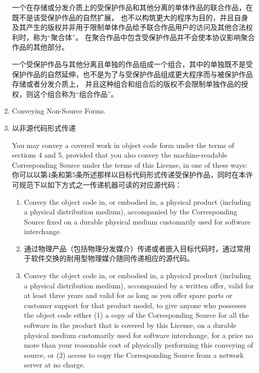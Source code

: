 \documentclass[11pt]{article}
\begin{document}
\begin{enumerate}
        一个在存储或分发介质上的受保护作品和其他分离的单体作品的联合作品，在既不是该受保护作品的自然扩展，
        也不以构筑更大的程序为目的，并且自身及其产生的版权并非用于限制单体作品给予联合作品用户的访问及其他合法权利时，称为“聚合体”。
        在聚合作品中包含受保护作品并不会使本协议影响聚合作品的其他部分。

        一个受保护作品与其他分离且单独的作品组成一个组合，其中的单独既不是受保护作品的自然延伸，也不是为了与受保护作品组成更大程序而与被保护作品存储或者分发介质上，
        并且这种组合和组合后的版权不会限制单独作品的授权，则这个组合称为“组合作品”。

  \item Conveying Non-Source Forms.
  \item 以非源代码形式传递

        You may convey a covered work in object code form under the terms
        of sections 4 and 5, provided that you also convey the
        machine-readable Corresponding Source under the terms of this License,
        in one of these ways:
        你可以以第4条和第5条所述那样以目标代码形式传递受保护作品，同时在本许可规范下以如下方式之一传递机器可读的对应源代码：

        \begin{enumerate}
          \item Convey the object code in, or embodied in, a physical product
                (including a physical distribution medium), accompanied by the
                Corresponding Source fixed on a durable physical medium
                customarily used for software interchange.
          \item 通过物理产品（包括物理分发媒介）传递或者嵌入目标代码时，通过常用于软件交换的耐用型物理媒介随同传递相应的源代码。

          \item Convey the object code in, or embodied in, a physical product
                (including a physical distribution medium), accompanied by a
                written offer, valid for at least three years and valid for as
                long as you offer spare parts or customer support for that product
                model, to give anyone who possesses the object code either (1) a
                copy of the Corresponding Source for all the software in the
                product that is covered by this License, on a durable physical
                medium customarily used for software interchange, for a price no
                more than your reasonable cost of physically performing this
                conveying of source, or (2) access to copy the
                Corresponding Source from a network server at no charge.


\end{enumerate}
\end{enumerate}
\end{document}
